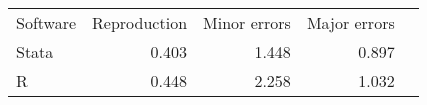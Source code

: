 \begin{tabular}{lrrrr}
\hline\hline
Software & Reproduction & Minor errors & Major errors \\
Stata & 0.403 & 1.448 & 0.897 \\
R & 0.448 & 2.258 & 1.032 \\
\hline\hline
\end{tabular}
